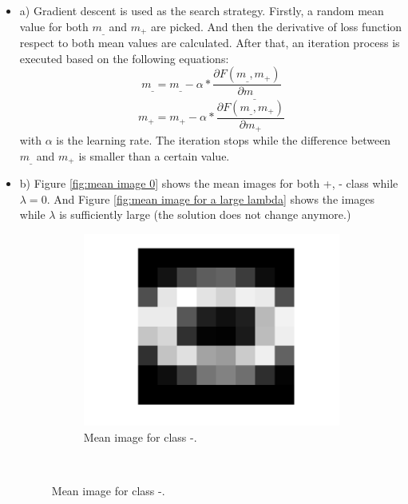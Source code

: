 \documentclass[a4paper,10pt]{article}
\begin{document}
\begin{itemize}
    \item a)
    Gradient descent is used as the search strategy. Firstly, a random mean value for both $m_\_$ and $m_+$ are picked. And then the derivative of loss function respect to both mean values are calculated. After that, an iteration process is executed based on the following equations:
        \begin{equation}
            m_\_ = m_\_ -\alpha*\frac{\partial F(m_\_,m_+)}{\partial m_\_}
        \end{equation}
        \begin{equation}
            m_+ = m_+ -\alpha*\frac{\partial F(m_\_,m_+)}{\partial m_+}
        \end{equation}
        with $\alpha$ is the learning rate. The iteration stops while the difference between $m_\_$ and $m_+$ is smaller than a certain value.
    \item b) Figure \ref{fig:mean image 0} shows the mean images for both {+, -} class while $\lambda = 0$. And Figure \ref{fig:mean image for a large lambda} shows the images while $\lambda$ is sufficiently large (the solution does not change anymore.)
        \begin{figure}[h]
            \centering
            \begin{subfigure}[b]{0.45\textwidth}
                \includegraphics[width=\textwidth]{mp_0.png}
                \caption{Mean image for class -.}
                \label{fig:mean image 0+}
            \end{subfigure}
            ~ %

\end{figure}
\end{itemize}
\end{document}
